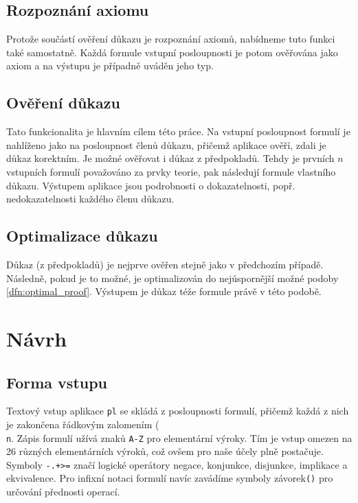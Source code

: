 \documentclass[thesis=B,czech,hidelinks]{thesis}[2012/06/26]
\begin{document}
\subsection{Rozpoznání axiomu}

Protože součástí ověření důkazu je rozpoznání axiomů, nabídneme tuto funkci také samostatně. Každá formule vstupní posloupnosti je potom ověřována jako axiom a na výstupu je případně uváděn jeho typ.

\subsection{Ověření důkazu}

Tato funkcionalita je hlavním cílem této práce. Na vstupní posloupnost formulí je nahlíženo jako na posloupnost členů důkazu, přičemž aplikace ověří, zdali je důkaz korektním. Je možné ověřovat i důkaz z předpokladů. Tehdy je prvních $n$ vstupních formulí považováno za prvky teorie, pak následují formule vlastního důkazu. Výstupem aplikace jsou podrobnosti o dokazatelnosti, popř. nedokazatelnosti každého členu důkazu.

\subsection{Optimalizace důkazu}

Důkaz (z předpokladů) je nejprve ověřen stejně jako v předchozím případě. Následně, pokud je to možné, je optimalizován do nejúspornější možné podoby \ref{dfn:optimal_proof}. Výstupem je důkaz téže formule právě v této podobě.

\section{Návrh}

\subsection{Forma vstupu}

Textový vstup aplikace \texttt{pl} se skládá z posloupnosti formulí, přičemž každá z nich je zakončena řádkovým zalomením (\texttt{\\n}. Zápis formulí užívá znaků \texttt{A-Z} pro elementární výroky. Tím je vstup omezen na 26 různých elementárních výroků, což ovšem pro naše účely plně postačuje. Symboly \texttt{-.+>=} značí logické operátory negace, konjunkce, disjunkce, implikace a ekvivalence. Pro infixní notaci formulí navíc zavádíme symboly závorek\texttt{()} pro určování přednosti operací.
\end{document}
